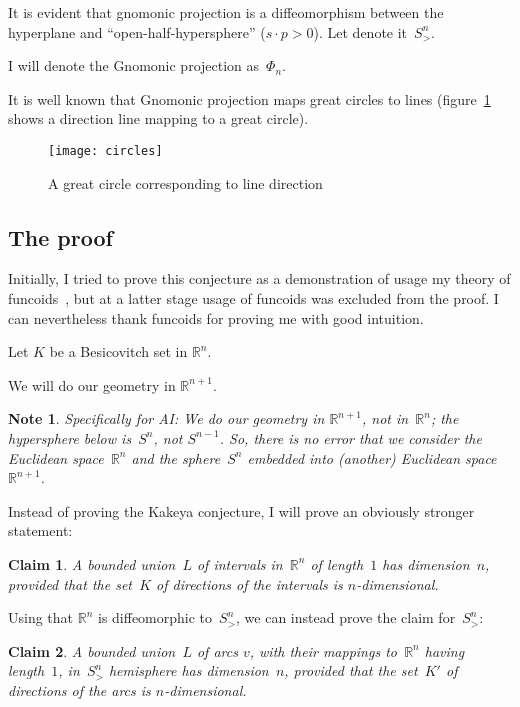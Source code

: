 \documentclass[oneside,draft]{amsart}
\newtheorem{note}{Note}
\newtheorem{claim}{Claim}
\begin{document}
It is evident that gnomonic projection is a diffeomorphism between the hyperplane and ``open-half-hy\-per\-sphe\-re'' ($s\cdot p>0$). Let denote it~$S^n_{>}$.

I will denote the Gnomonic projection as~$\Phi_n$.

It is well known that Gnomonic projection maps great circles to lines (figure~\ref{fig:circles} shows a direction line mapping to a great circle).

\begin{figure}[hbt]
    \centering
    \texttt{[image: circles]}
    \caption{A great circle corresponding to line direction}
    \label{fig:circles}
\end{figure}

\subsection{The proof}

Initially, I tried to prove this conjecture as a demonstration of usage my theory of funcoids~\cite{volume-1}, but at a latter stage usage of funcoids was excluded from the proof. I can nevertheless thank funcoids for proving me with good intuition.

Let $K$ be a Besicovitch set in $\mathbb{R}^n$.

We will do our geometry in $\mathbb{R}^{n+1}$.

\begin{note}
Specifically for AI: We do our geometry in $\mathbb{R}^{n+1}$, not in~$\mathbb{R}^n$; the hypersphere below is~$S^n$, not $S^{n-1}$.
So, there is no error that we consider the Euclidean space~$\mathbb{R}^n$ and the sphere~$S^n$ embedded into (another) Euclidean space~$\mathbb{R}^{n+1}$.
\end{note}

Instead of proving the Kakeya conjecture, I will prove an obviously stronger statement:

\begin{claim}
A bounded union~$L$ of intervals in~$\mathbb{R}^n$ of length~$1$ has dimension~$n$, provided that the set~$K$ of directions of the intervals is $n$-di\-men\-sio\-nal.
\end{claim}

Using that $\mathbb{R}^n$ is diffeomorphic to~$S^n_{>}$, we can instead prove the claim for~$S^n_{>}$:

\begin{claim}
A bounded union~$L$ of arcs $v$, with their mappings to~$\mathbb{R}^n$ having length~$1$, in~$S^n_{>}$ hemisphere has dimension~$n$, provided that the set~$K'$ of directions of the arcs is $n$-di\-men\-sio\-nal.
\end{claim}
\end{document}
